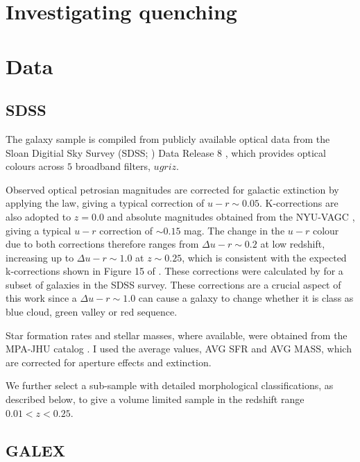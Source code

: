 \section{Investigating quenching}\label{sec:invquench}


\section{Data}\label{sec:data}

\subsection{SDSS}\label{sec:sdssintro}

The galaxy sample is compiled from publicly available optical data from the Sloan Digitial Sky Survey (SDSS; \citealt{York00}) Data Release 8 \citep{Aihara11}, which provides optical colours across $5$ broadband filters, $ugriz$. 

Observed optical petrosian magnitudes are corrected for galactic extinction \citep{Oh11} by applying the \citet*{Cardelli89} law, giving a typical correction of $u-r \sim 0.05$. K-corrections are also adopted to $z=0.0$ and absolute magnitudes obtained from the NYU-VAGC \citep{Blanton05, padmanabhan08, blanton07}, giving a typical $u-r$ correction of $\sim 0.15$ mag. The change in the $u-r$ colour due to both corrections therefore ranges from $\Delta u-r \sim 0.2$ at low redshift, increasing up to $\Delta u-r \sim 1.0$ at $z \sim 0.25$, which is consistent with the expected k-corrections shown in Figure 15 of \citet{blanton07}. These corrections were calculated by \citet{Bamford09} for a subset of galaxies in the SDSS survey. These corrections are a crucial aspect of this work since a $\Delta u-r \sim 1.0$ can cause a galaxy to change whether it is class as blue cloud, green valley or red sequence.

Star formation rates and stellar masses, where available, were obtained from the MPA-JHU catalog \citep{kauffmann03, brinchmann04}. I used the average values, \textsc{AVG SFR} and \textsc{AVG MASS}, which are corrected for aperture effects and extinction.

We further select a sub-sample with detailed morphological classifications, as described below,  to give a volume limited sample in the redshift range $0.01 < z < 0.25$.


\subsection{GALEX}\label{sec:galexintro}

